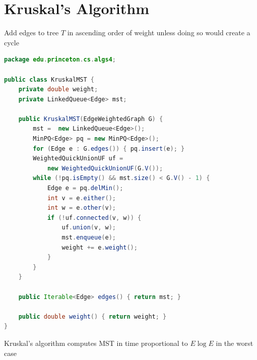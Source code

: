 \documentclass[8pt,a4paper,compress]{beamer}
\begin{document}
\section{Kruskal's Algorithm}
\begin{frame}[fragile]
\pause

Add edges to tree $T$ in ascending order of weight unless doing so would create a cycle

\pause
\bigskip

\begin{lstlisting}[language=Java]
package edu.princeton.cs.algs4;

public class KruskalMST {
    private double weight;  
    private LinkedQueue<Edge> mst;
    
    public KruskalMST(EdgeWeightedGraph G) {
        mst =  new LinkedQueue<Edge>();  
        MinPQ<Edge> pq = new MinPQ<Edge>();
        for (Edge e : G.edges()) { pq.insert(e); }
        WeightedQuickUnionUF uf = 
            new WeightedQuickUnionUF(G.V());
        while (!pq.isEmpty() && mst.size() < G.V() - 1) {
            Edge e = pq.delMin();
            int v = e.either();
            int w = e.other(v);
            if (!uf.connected(v, w)) { 
                uf.union(v, w); 
                mst.enqueue(e); 
                weight += e.weight();
            }
        }
    }

    public Iterable<Edge> edges() { return mst; }

    public double weight() { return weight; }
}
\end{lstlisting}

\pause
\bigskip

Kruskal's algorithm computes MST in time proportional to
$E \log E$ in the worst case
\end{frame}
\end{document}

